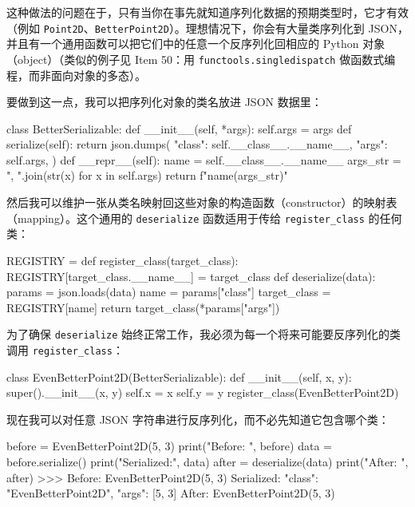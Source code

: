 这种做法的问题在于，只有当你在事先就知道序列化数据的预期类型时，它才有效（例如 \texttt{Point2D}、\texttt{BetterPoint2D}）。理想情况下，你会有大量类序列化到 JSON，并且有一个通用函数可以把它们中的任意一个反序列化回相应的 Python 对象（object）（类似的例子见 Item 50：用 \texttt{functools.singledispatch} 做函数式编程，而非面向对象的多态）。

要做到这一点，我可以把序列化对象的类名放进 JSON 数据里：

\begin{codebox}[python]
class BetterSerializable:
    def __init__(self, *args):
        self.args = args
    def serialize(self):
        return json.dumps(
            {
                "class": self.__class__.__name__,
                "args": self.args,
            }
        )
    def __repr__(self):
        name = self.__class__.__name__
        args_str = ", ".join(str(x) for x in self.args)
        return f"{name}({args_str})"
\end{codebox}

然后我可以维护一张从类名映射回这些对象的构造函数（constructor）的映射表（mapping）。这个通用的 \texttt{deserialize} 函数适用于传给 \texttt{register\_class} 的任何类：

\begin{codebox}[python]
REGISTRY = {}
def register_class(target_class):
    REGISTRY[target_class.__name__] = target_class
def deserialize(data):
    params = json.loads(data)
    name = params["class"]
    target_class = REGISTRY[name]
    return target_class(*params["args"])
\end{codebox}

为了确保 \texttt{deserialize} 始终正常工作，我必须为每一个将来可能要反序列化的类调用 \texttt{register\_class}：

\begin{codebox}[python]
class EvenBetterPoint2D(BetterSerializable):
    def __init__(self, x, y):
        super().__init__(x, y)
        self.x = x
        self.y = y
register_class(EvenBetterPoint2D)
\end{codebox}

现在我可以对任意 JSON 字符串进行反序列化，而不必先知道它包含哪个类：

\begin{codebox}[python]
before = EvenBetterPoint2D(5, 3)
print("Before:    ", before)
data = before.serialize()
print("Serialized:", data)
after = deserialize(data)
print("After:     ", after)
>>>
Before:     EvenBetterPoint2D(5, 3)
Serialized: {"class": "EvenBetterPoint2D", "args": [5, 3]}
After:      EvenBetterPoint2D(5, 3)
\end{codebox}

